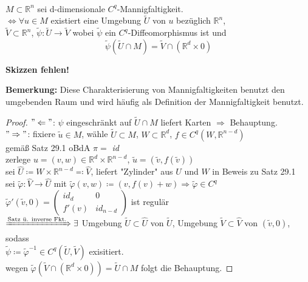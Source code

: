 \begin{sa}
\mbox{} \\
$M \subset \mathbb{R}^n $ sei d-dimensionale $C^q$-Mannigfaltigkeit. \\
$\Longleftrightarrow \forall u \in M $ existiert eine Umgebung $\tilde{U}$ von $u$ 
bezüglich $\mathbb{R}^n$, \\
$\tilde{V} \subset \mathbb{R}^n $, 
$\tilde{\psi}: \tilde{U} \rightarrow \tilde{V} $ wobei $\tilde{\psi} $ 
ein $C^q$-Diffeomorphismus ist und 
    \begin{equation*}
    \tilde{\psi} \left( \tilde{U} \cap M \right) =
    \tilde{V} \cap \left( \mathbb{R}^d \times {0} \right) 
    \end{equation*}

\textbf{Skizzen fehlen!}
\end{sa}

\textbf{Bemerkung:} Diese Charakterisierung von Mannigfaltigkeiten benutzt den umgebenden Raum und wird häufig als Definition der Mannigfaltigkeit benutzt.    
    
\begin{proof}
$"\Leftarrow"$: $\psi $ eingeschränkt auf $\tilde{U} \cap M $ liefert Karten 
$\Rightarrow$ Behauptung. \\
$"\Rightarrow"$: fixiere $\tilde{u} \in M $, wähle $\tilde{U} \subset M $,
$W \subset \mathbb{R}^d $, $f \in C^q \left( W, \mathbb{R}^{n-d} \right)$ \\
gemäß Satz 29.1 oBdA $\pi = $ \textit{id} \\
zerlege $u = (v,w) \in \mathbb{R}^d \times \mathbb{R}^{n-d}$, 
$\tilde{u} = \left( \tilde{v}, f \left( \tilde{v} \right) \right) $ \\
sei $\hat{U} \coloneqq W \times \mathbb{R}^{n-d} \eqqcolon \hat{V} $,
liefert "Zylinder" aus $U$ und $W$ in Beweis zu Satz 29.1 \\
sei $\tilde{\varphi}: \hat{V} \rightarrow \hat{U} $ mit
$\tilde{\varphi} (v,w) \coloneqq (v, f(v) + w) \Rightarrow \tilde{\varphi} \in C^q $ \\
$\tilde{\varphi}' \left( \tilde{v}, 0 \right) =
    \begin{pmatrix}
    \textit{id}_d & 0 \\
    f'(v)         & \textit{id}_{n-d}
    \end{pmatrix}
$ ist regulär \\
$\xRightarrow{\text{Satz ü. inverse Fkt.}} \exists $ 
Umgebung $ \tilde{U} \subset \hat{U}$ von $\tilde{U}$,
Umgebung $ \tilde{V} \subset \hat{V} $ von $ \left( \tilde{v}, 0 \right) $, sodass \\
$\tilde{\psi} \coloneqq \tilde{\varphi}^{-1} \in C^q \left( \tilde{U}, \tilde{V} \right) $
exisitiert. \\
wegen $\tilde{\varphi} \left( \tilde{V} \cap \left( \mathbb{R}^d \times {0} \right) \right)
= \tilde{U} \cap M $ folgt die Behauptung.
\end{proof}

